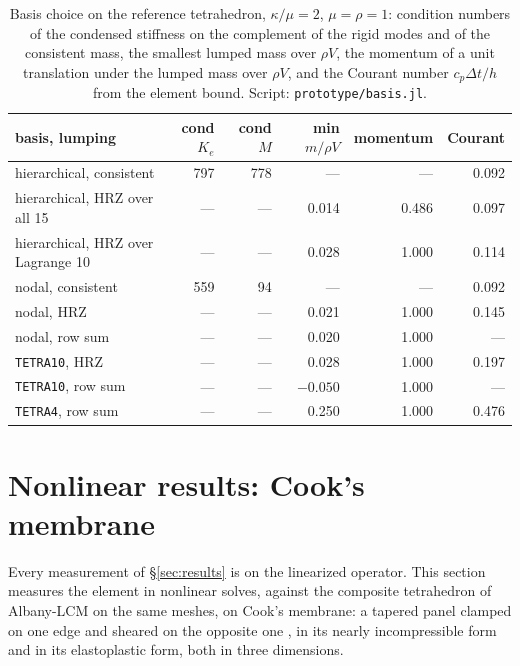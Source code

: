 \documentclass[11pt]{article}
\newcommand{\code}[1]{\texttt{#1}}
\theoremstyle{definition}
\theoremstyle{plain}
\begin{document}
\begin{table}[tbp]
\centering
\caption{Basis choice on the reference tetrahedron, $\kappa/\mu = 2$,
$\mu = \rho = 1$: condition numbers of the condensed stiffness on the
complement of the rigid modes and of the consistent mass, the smallest
lumped mass over $\rho V$, the momentum of a unit translation under the
lumped mass over $\rho V$, and the Courant number $c_p\Delta t/h$ from the
element bound. Script: \code{prototype/basis.jl}.}
\label{tab:basis}
\begin{tabular}{@{}lrrrrr@{}}
\toprule
basis, lumping & cond $~K_e$ & cond $~M$ & min $m/\rho V$ & momentum & Courant \\
\midrule
hierarchical, consistent            & 797 & 778 & ---    & ---   & 0.092 \\
hierarchical, HRZ over all 15       & --- & --- & 0.014  & 0.486 & 0.097 \\
hierarchical, HRZ over Lagrange 10  & --- & --- & 0.028  & 1.000 & 0.114 \\
nodal, consistent                   & 559 & 94  & ---    & ---   & 0.092 \\
nodal, HRZ                          & --- & --- & 0.021  & 1.000 & 0.145 \\
nodal, row sum                      & --- & --- & 0.020  & 1.000 & --- \\
\code{TETRA10}, HRZ                 & --- & --- & 0.028  & 1.000 & 0.197 \\
\code{TETRA10}, row sum             & --- & --- & $-0.050$ & 1.000 & --- \\
\code{TETRA4}, row sum              & --- & --- & 0.250  & 1.000 & 0.476 \\
\bottomrule
\end{tabular}
\end{table}

\section{Nonlinear results: Cook's membrane}
\label{sec:cook}

Every measurement of \S\ref{sec:results} is on the linearized operator.
This section measures the element in nonlinear solves, against the
composite tetrahedron of Albany-LCM on the same meshes, on Cook's membrane:
a tapered panel clamped on one edge and sheared on the opposite one
\citep{Cook:1974}, in its nearly incompressible form \citep{SimoArmero:1992}
and in its elastoplastic form, both in three dimensions.
\end{document}
